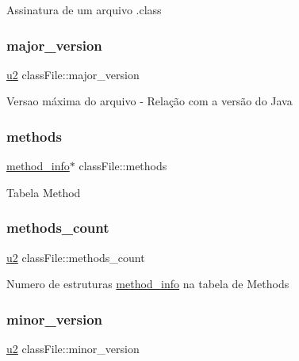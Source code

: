 Assinatura de um arquivo .class \mbox{\label{structclassFile_a3765d2f6ef5f54e8e2c554afadb795f6}} 
\subsubsection{\texorpdfstring{major\+\_\+version}{major\_version}}
{\footnotesize\ttfamily \hyperlink{lista__operandos_8h_a732cde1300aafb73b0ea6c2558a7a54f}{u2} class\+File\+::major\+\_\+version}

Versao máxima do arquivo -\/ Relação com a versão do Java \mbox{\label{structclassFile_a5417beaa23b6e9d5329dbee87a1f5238}} 
\subsubsection{\texorpdfstring{methods}{methods}}
{\footnotesize\ttfamily \hyperlink{structmethod__info}{method\+\_\+info}$\ast$ class\+File\+::methods}

Tabela Method \mbox{\label{structclassFile_a8c3eb4279e03c8b8f6525b6dd0ff6126}} 
\subsubsection{\texorpdfstring{methods\+\_\+count}{methods\_count}}
{\footnotesize\ttfamily \hyperlink{lista__operandos_8h_a732cde1300aafb73b0ea6c2558a7a54f}{u2} class\+File\+::methods\+\_\+count}

Numero de estruturas \hyperlink{structmethod__info}{method\+\_\+info} na tabela de Methods \mbox{\label{structclassFile_aa7b4e7ee91468a9a2989dd9ec93c3ea0}} 
\subsubsection{\texorpdfstring{minor\+\_\+version}{minor\_version}}
{\footnotesize\ttfamily \hyperlink{lista__operandos_8h_a732cde1300aafb73b0ea6c2558a7a54f}{u2} class\+File\+::minor\+\_\+version}


